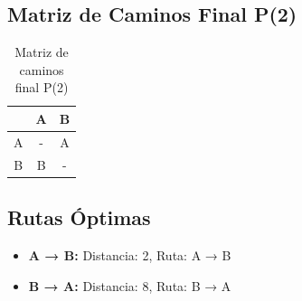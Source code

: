 \documentclass[12pt]{article}
\begin{document}
\clearpage
\subsection{Matriz de Caminos Final P(2)}
\begin{table}[h!]
\centering
\begin{tabular}{|c|c|c|}
\hline
 & A & B \\\hline
A & - & A \\\hline
B & B & - \\\hline
\end{tabular}
\caption{Matriz de caminos final P(2)}
\end{table}

\clearpage
\subsection{Rutas Óptimas}
\begin{itemize}
\item \textbf{A → B:} Distancia: 2, Ruta: A → B
\item \textbf{B → A:} Distancia: 8, Ruta: B → A
\end{itemize}
\end{document}
